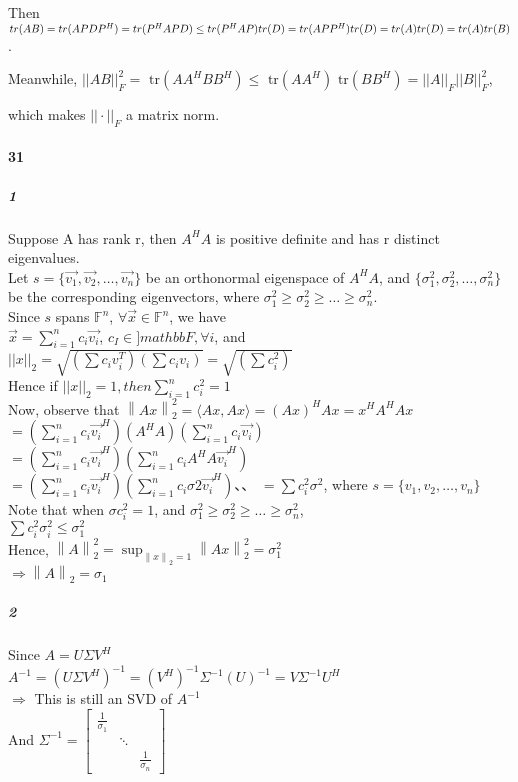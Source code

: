 \documentclass[10pt,letter]{article}
\newcommand\norm[1]{\left\lVert#1\right\rVert}
\begin{document}
Then $tr(AB) = tr (APDP^{H}) = tr(P^{H}APD) \leq tr(P^{H}AP)tr(D) \\ = tr(APP^{H})tr(D) = tr(A)tr(D) = tr(A)tr(B)$.

Meanwhile, 
$||AB||_F^2 = \text{ tr}(AA^HBB^H) \leq \text{ tr}(AA^H) \text{ tr}(BB^H) = ||A||_F ||B||_F^2 $,

which makes $|| \cdot ||_F$ a matrix norm.
\paragraph{31} 
\subparagraph{1}
Suppose A has rank r, then $A^HA$ is positive definite and has r distinct eigenvalues. \\
Let $s=\{\vec{v_1},\vec{v_2},\dots,\vec{v_n} \}$ be an orthonormal eigenspace of $A^HA$, and $\{\sigma_1^2,\sigma_2^2,\dots,\sigma_n^2 \}$ be the corresponding eigenvectors, where $\sigma_1^2\geq\sigma_2^2\geq\dots\geq\sigma_n^2$.\\
Since $s$ spans $\mathbb{F}^n$, $\forall \vec{x}\in \mathbb{F}^n$, we have \\
$\vec{x}=\sum_{i=1}^nc_i\vec{v_i}$,  $c_I\in]mathbb{F}, \forall i$, and \\
$||x||_2=\sqrt{(\sum c_iv_i^T)(\sum c_iv_i)}=\sqrt{(\sum c_i^2)}$ \\
Hence if $||x||_2=1, then \sum_{i=1}^n c_i^2=1$\\
Now, observe that $\norm{Ax}_2^2=\langle Ax,Ax \rangle=(Ax)^HAx=x^HA^HAx$\\
$=(\sum_{i=1}^nc_i\vec{v_i}^H)(A^HA)(\sum_{i=1}^nc_i\vec{v_i})$\\
$=(\sum_{i=1}^nc_i\vec{v_i}^H)(\sum_{i=1}^nc_iA^HA\vec{v_i}^H)$\\
$=(\sum_{i=1}^nc_i\vec{v_i}^H)(\sum_{i=1}^nc_i\sigma2\vec{v_i}^H)$、、
$=\sum c_i^2\sigma^2$, where $s=\{v_1,v_2,\dots,v_n \}$\\
Note that when $\sigma c_i^2=1$, and $\sigma_1^2\geq\sigma_2^2\geq\dots\geq\sigma_n^2$,\\
$\sum c_i^2\sigma_i^2\leq \sigma_1^2$\\
Hence, $\norm{A}_2^2=\sup_{\norm{x}_2=1}\norm{Ax}_2^2=\sigma_1^2$\\
$\Rightarrow \norm{A}_2=\sigma_1$
\subparagraph{2}
Since $A=U\Sigma V^H$\\
$A^{-1}=(U\Sigma V^H)^{-1}=(V^H)^{-1}\Sigma^{-1}(U)^{-1}=V\Sigma^{-1}U^H$\\
$\Rightarrow $ This is still an SVD of $A^{-1}$\\
And $\Sigma^{-1}=\begin{bmatrix}
\frac{1}{\sigma_1}&&\\
&\ddots&\\
&&\frac{1}{\sigma_n}
\end{bmatrix}$\\
\end{document}
